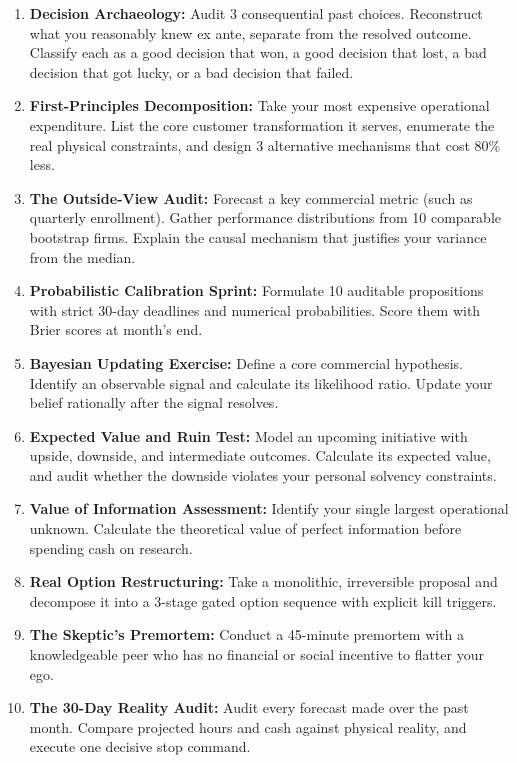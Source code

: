 \begin{enumerate}[leftmargin=12pt,itemsep=2pt,topsep=1pt,parsep=0pt]
  \item \textbf{Decision Archaeology:} Audit 3 consequential past choices. Reconstruct what you reasonably knew ex ante, separate from the resolved outcome. Classify each as a good decision that won, a good decision that lost, a bad decision that got lucky, or a bad decision that failed.
  \item \textbf{First-Principles Decomposition:} Take your most expensive operational expenditure. List the core customer transformation it serves, enumerate the real physical constraints, and design 3 alternative mechanisms that cost 80\% less.
  \item \textbf{The Outside-View Audit:} Forecast a key commercial metric (such as quarterly enrollment). Gather performance distributions from 10 comparable bootstrap firms. Explain the causal mechanism that justifies your variance from the median.
  \item \textbf{Probabilistic Calibration Sprint:} Formulate 10 auditable propositions with strict 30-day deadlines and numerical probabilities. Score them with Brier scores at month's end.
  \item \textbf{Bayesian Updating Exercise:} Define a core commercial hypothesis. Identify an observable signal and calculate its likelihood ratio. Update your belief rationally after the signal resolves.
  \item \textbf{Expected Value and Ruin Test:} Model an upcoming initiative with upside, downside, and intermediate outcomes. Calculate its expected value, and audit whether the downside violates your personal solvency constraints.
  \item \textbf{Value of Information Assessment:} Identify your single largest operational unknown. Calculate the theoretical value of perfect information before spending cash on research.
  \item \textbf{Real Option Restructuring:} Take a monolithic, irreversible proposal and decompose it into a 3-stage gated option sequence with explicit kill triggers.
  \item \textbf{The Skeptic's Premortem:} Conduct a 45-minute premortem with a knowledgeable peer who has no financial or social incentive to flatter your ego.
  \item \textbf{The 30-Day Reality Audit:} Audit every forecast made over the past month. Compare projected hours and cash against physical reality, and execute one decisive stop command.
\end{enumerate}

